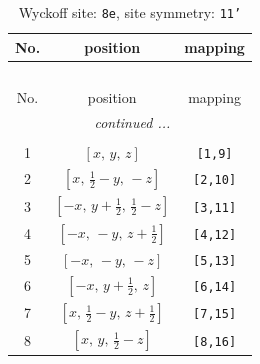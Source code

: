 \documentclass[fleqn,8pt]{jsarticle}
\begin{document}
\renewcommand{\arraystretch}{1.2}
\begin{longtable}{ccc}
\caption{Wyckoff site: {\tt 8e}, site symmetry: {\tt 11'}}
 \\
 \hline \hline
No. & position & mapping \\ \hline \endfirsthead

\multicolumn{2}{l}{\tablename\ \thetable{}} \\
 \hline \hline
No. & position & mapping \\ \hline \endhead

 \hline \hline
\multicolumn{2}{r}{\footnotesize\it continued ...} \\ \endfoot

 \hline \hline
\multicolumn{2}{r}{} \\ \endlastfoot

1 & $\left[ x,\, y,\, z \right]$ & {\tt [1,9]} \\ \hline
2 & $\left[ x,\, \frac{1}{2} - y,\, - z \right]$ & {\tt [2,10]} \\ \hline
3 & $\left[ - x,\, y + \frac{1}{2},\, \frac{1}{2} - z \right]$ & {\tt [3,11]} \\ \hline
4 & $\left[ - x,\, - y,\, z + \frac{1}{2} \right]$ & {\tt [4,12]} \\ \hline
5 & $\left[ - x,\, - y,\, - z \right]$ & {\tt [5,13]} \\ \hline
6 & $\left[ - x,\, y + \frac{1}{2},\, z \right]$ & {\tt [6,14]} \\ \hline
7 & $\left[ x,\, \frac{1}{2} - y,\, z + \frac{1}{2} \right]$ & {\tt [7,15]} \\ \hline
8 & $\left[ x,\, y,\, \frac{1}{2} - z \right]$ & {\tt [8,16]} \\
\end{longtable}
\end{document}
